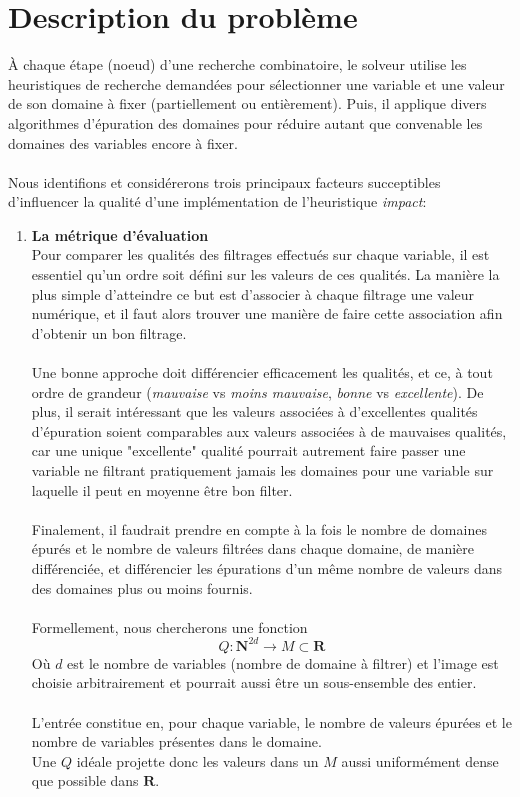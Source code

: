 \documentclass{article}
\begin{document}
\section{Description du problème}
À chaque étape (noeud) d'une recherche combinatoire, le solveur utilise
les heuristiques de recherche demandées pour sélectionner une variable
et une valeur de son domaine à fixer (partiellement ou entièrement). Puis,
il applique divers algorithmes d'épuration des domaines pour réduire autant
que convenable les domaines des variables encore à fixer. \\
\\
Nous identifions et considérerons trois principaux facteurs succeptibles
d'influencer la qualité d'une implémentation de l'heuristique
\textit{impact}: \\
\begin{enumerate}
\item \textbf{La métrique d'évaluation \\}
Pour comparer les qualités des filtrages effectués sur chaque variable, il
est essentiel qu'un ordre soit défini sur les valeurs de ces qualités. La
manière la plus simple d'atteindre ce but est d'associer à chaque filtrage
une valeur numérique, et il faut alors trouver une manière de faire cette
association afin d'obtenir un bon filtrage. \\
\\
Une bonne approche doit différencier efficacement les qualités, et ce, à 
tout ordre de grandeur (\textit{mauvaise} vs \textit{moins mauvaise}, 
\textit{bonne} vs \textit{excellente}). De plus, il serait intéressant que
les valeurs associées à d'excellentes qualités d'épuration soient comparables
aux valeurs associées à de mauvaises qualités, car une unique "excellente" 
qualité pourrait autrement faire passer une variable ne filtrant pratiquement
jamais les domaines pour une variable sur laquelle il peut en moyenne être
bon filter. \\
\\
Finalement, il faudrait prendre en compte à la fois le nombre de domaines
épurés et le nombre de valeurs filtrées dans chaque domaine, de manière
différenciée, et différencier les épurations d'un même nombre de valeurs
dans des domaines plus ou moins fournis. \\
\\
Formellement, nous chercherons une fonction
\[ Q: \mathbf{N}^{2d} \rightarrow M \subset \mathbf{R} \]
Où $d$ est le nombre de variables (nombre de domaine à filtrer) et l'image
est choisie arbitrairement et pourrait aussi être un sous-ensemble des
entier. \\
\\
L'entrée constitue en, pour chaque variable, le nombre de valeurs épurées
et le nombre de variables présentes dans le domaine. \\
Une $Q$ idéale projette donc les valeurs dans un $M$ aussi uniformément
dense que possible dans $\mathbf{R}$. \\



\end{enumerate}
\end{document}
